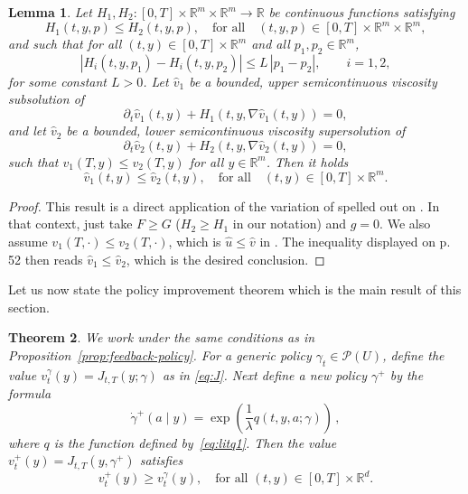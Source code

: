 \documentclass[12pt,reqno]{amsart}
\numberwithin{equation}{section}  %
\newcommand{\1}{{\bf 1}}
\newcommand{\2}{{\bf 2}}
\newcommand{\R}{\mathbb R}
\newcommand{\cp}{\mathcal P}
\newcommand{\ga}{\gamma}
\newcommand{\la}{\lambda}
\newcommand{\lp}{\left(}
\newcommand{\rp}{\right)}
\newtheorem{theorem}{Theorem}[section]
\newtheorem{lemma}[theorem]{Lemma}
\theoremstyle{remark}
\theoremstyle{remark}
\newcommand{\beq}{\begin{equation}}
\newcommand{\eeq}{\end{equation}}
\begin{document}

\begin{lemma}\label{lem:comparison}
Let $H_1, H_2 : [0,T] \times \R^m \times \R^m \to \R$ be continuous functions satisfying
\[
H_1(t,y,p) \leq H_2(t,y,p), 
\quad \text{for all}\quad (t,y,p) \in [0,T]\times\R^m\times\R^m,
\]
and such that for all $(t,y)\in[0,T]\times\R^m$ and all $p_1,p_2\in\R^m$,
\[
|H_i(t,y,p_1) - H_i(t,y,p_2)| \le L\,|p_1 - p_2|, \qquad i=1,2,
\]
for some constant $L>0$.
Let $\hat{v}_1$ be a bounded, upper semicontinuous viscosity subsolution of
\[
\partial_t \hat{v}_1(t,y) + H_1(t,y,\nabla \hat{v}_1(t,y)) = 0,
\]
and let $\hat{v}_2$ be a bounded, lower semicontinuous viscosity supersolution of
\[
\partial_t \hat{v}_2(t,y) + H_2(t,y,\nabla \hat{v}_2(t,y)) = 0,
\]
such that $v_1(T,y) \le v_2(T,y)$ for all $y\in\R^m$. Then it holds 
\[
\hat{v}_1(t,y) \le \hat{v}_2(t,y), 
\quad \text{for all}\quad (t,y)\in[0,T]\times\R^m.
\]
\end{lemma}

\begin{proof}
This result is a direct application of the variation of \cite[Theorem~8.2]{crandall-ishi-lyons} spelled out on \cite[p. 52]{crandall-ishi-lyons}. In that context, just take $F \geq G$ ($H_2 \geq H_1$ in our notation) and $g = 0$. We also assume $v_1(T, \cdot) \leq v_2(T, \cdot)$, which is $\hat{u} \leq \hat{v}$ in \cite{crandall-ishi-lyons}. The inequality displayed on p. 52 then reads $\hat{v}_1 \leq \hat{v}_2$, which is the desired conclusion.
\end{proof}

Let us now state the policy improvement theorem which is the main result of this section. 

\begin{theorem}%
We work under the same conditions as in Proposition~\ref{prop:feedback-policy}. For a generic policy $\ga_t \in \cp(U)$, define the value $v_t^{\ga}(y) = J_{t,T}(y;\ga)$ as in \eqref{eq:J}. Next define a new policy $\ga^{+}$ by the formula 
\beq\label{eq:ga+}
\dot{\ga}^{+} (a \mid y) = \exp\lp \frac{1}{\la} q(t,y,a;\ga) \rp \, ,
\eeq
where $q$ is the function defined by~\eqref{eq:litq1}.
Then the value $v_t^{+}(y) = J_{t,T}(y, \ga^{+})$ satisfies
\beq\label{eq:value-improved}
v_t^{+}(y) \geq v_t^{\ga}(y), \quad \text{for all }(t,y) \in [0,T] \times \R^d. 
\eeq
\end{theorem}
\end{document}
